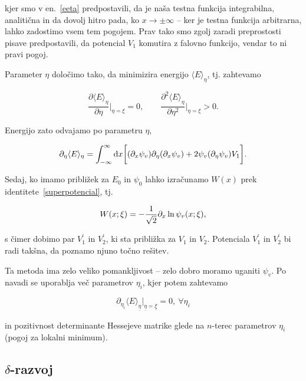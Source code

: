 \ni kjer smo v en.~\eqref{eeta} predpostavili, da je na\v sa testna funkcija integrabilna, analiti\v cna in da dovolj hitro pada, ko
$x \to \pm \infty$ -- ker je testna funkcija arbitrarna, lahko zadostimo vsem tem pogojem. Prav tako smo zgolj zaradi preprostosti
pisave predpostavili, da potencial $V_1$ komutira z falovno funkcijo, vendar to ni pravi pogoj.

Parameter $\eta$ dolo\v cimo tako, da minimizira energijo $\langle E \rangle_\eta$, tj. zahtevamo

\begin{equation}
	\frac{\partial \langle E \rangle_\eta}{\partial\eta}\bigg|_{\eta = \xi} = 0, \qquad
	\frac{\partial^2 \langle E \rangle_\eta}{\partial\eta^2}\bigg|_{\eta = \xi} > 0.
\end{equation}

\ni Energijo zato odvajamo po parametru $\eta$,

\begin{equation}
	\partial_\eta\langle E\rangle_\eta = \int_{-\infty}^\infty\text{d} x\bigg[(\partial_x \psi_v) \partial_\eta (\partial_x \psi_v) +  2 \psi_v (\partial_\eta \psi_v) V_1\bigg].
\end{equation}

\ni Sedaj, ko imamo pribli\v zek za $E_0$ in $\psi_0$ lahko izra\v cunamo $W(x)$ prek identitete~\eqref{superpotencial}, tj.

\begin{equation}
	W (x; \xi) = -\frac{1}{\sqrt{2}}\partial_x\ln\psi_v (x;\xi),
\end{equation}

\ni s \v cimer dobimo par $V_1^\prime$ in $V_2^\prime$, ki sta pribli\v zka za $V_1$ in $V_2$. Potenciala $V_1^\prime$ in $V_2^\prime$
bi radi tak\v sna, da poznamo njuno to\v cno re\v sitev.

Ta metoda ima zelo veliko pomankljivost -- zelo dobro moramo uganiti $\psi_v$. Po navadi se uporablja ve\v c parametrov $\eta_i$, kjer
potem zahtevamo

\begin{equation}
	\partial_{\eta_i} \langle E \rangle_{\underline\eta}\Big|_{\underline{\eta} = \underline{\xi}} = 0, \ \forall \eta_i
\end{equation}

in pozitivnost determinante Hessejeve matrike glede na $n$-terec parametrov $\eta_i$ (pogoj za lokalni minimum).

\subsection{$\delta$-razvoj}

